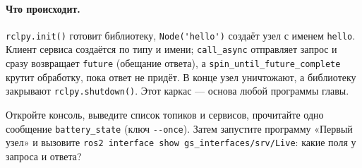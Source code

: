 \paragraph{Что происходит.} \verb|rclpy.init()| готовит библиотеку, \verb|Node('hello')| создаёт узел с именем \verb|hello|. Клиент сервиса создаётся по типу и имени; \verb|call_async| отправляет запрос и сразу возвращает \verb|future| (обещание ответа), а \verb|spin_until_future_complete| крутит обработку, пока ответ не придёт. В конце узел уничтожают, а библиотеку закрывают \verb|rclpy.shutdown()|. Этот каркас --- основа любой программы главы.

\begin{taskbox}
Откройте консоль, выведите список топиков и сервисов, прочитайте одно сообщение \texttt{battery\_state} (ключ \verb|--once|). Затем запустите программу «Первый узел» и вызовите \verb|ros2 interface show gs_interfaces/srv/Live|: какие поля у запроса и ответа?
\end{taskbox}
